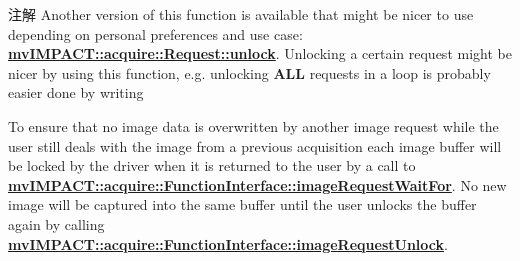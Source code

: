 \begin{DoxyNote}{注解}
Another version of this function is available that might be nicer to use depending on personal preferences and use case\+: {\bfseries \hyperlink{classmv_i_m_p_a_c_t_1_1acquire_1_1_request_a3c30ced407d20caef49e3148257cd91e}{mv\+I\+M\+P\+A\+C\+T\+::acquire\+::\+Request\+::unlock}}. Unlocking a certain request might be nicer by using this function, e.\+g. unlocking {\bfseries A\+L\+L} requests in a loop is probably easier done by writing
\end{DoxyNote}
To ensure that no image data is overwritten by another image request while the user still deals with the image from a previous acquisition each image buffer will be locked by the driver when it is returned to the user by a call to {\bfseries \hyperlink{classmv_i_m_p_a_c_t_1_1acquire_1_1_function_interface_a4cefdfda8e8940736ae9a4c97b6de8c9}{mv\+I\+M\+P\+A\+C\+T\+::acquire\+::\+Function\+Interface\+::image\+Request\+Wait\+For}}. No new image will be captured into the same buffer until the user unlocks the buffer again by calling {\bfseries \hyperlink{classmv_i_m_p_a_c_t_1_1acquire_1_1_function_interface_a378a338217d5a681e880a0d9395f1a62}{mv\+I\+M\+P\+A\+C\+T\+::acquire\+::\+Function\+Interface\+::image\+Request\+Unlock}}.

